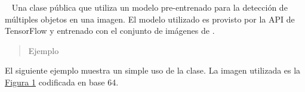 \begin{fulllineitems}
\label{\detokenize{chapter_two/desc_cloudnao:app.tf_models.object_detection.ObjectDetectionTensorflow}}~
Una clase pública que utiliza un modelo pre-entrenado para la detección
de múltiples objetos en una imagen. El modelo utilizado es
 provisto por la API de TensorFlow y entrenado con el
conjunto de imágenes de .
\begin{quote}\begin{description}
\item[{Ejemplo}] \leavevmode
\end{description}\end{quote}

El siguiente ejemplo
muestra un simple uso de la clase. La imagen utilizada es la \hyperref[\detokenize{chapter_two/desc_cloudnao:obj-detec-before}]{Figura \ref{\detokenize{chapter_two/desc_cloudnao:obj-detec-before}}}
codificada en base 64.

\begin{figure}[htbp]
\centering

\noindent{}
\label{\detokenize{chapter_two/desc_cloudnao:obj-detec-before}}\end{figure}


\end{fulllineitems}
